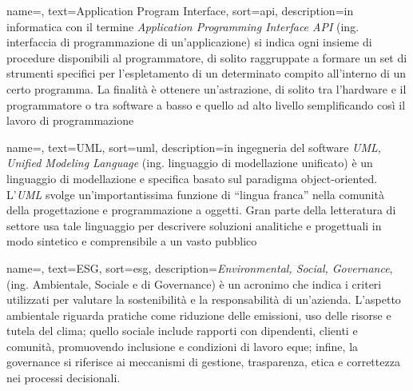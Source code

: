 




 {
    name=,
    text=Application Program Interface,
    sort=api,
    description={in informatica con il termine \emph{Application Programming Interface API} (ing. interfaccia di programmazione di un'applicazione) si indica ogni insieme di procedure disponibili al programmatore, di solito raggruppate a formare un set di strumenti specifici per l'espletamento di un determinato compito all'interno di un certo programma. La finalità è ottenere un'astrazione, di solito tra l'hardware e il programmatore o tra software a basso e quello ad alto livello semplificando così il lavoro di programmazione}
}

 {
    name=,
    text=UML,
    sort=uml,
    description={in ingegneria del software \emph{UML, Unified Modeling Language} (ing. linguaggio di modellazione unificato) è un linguaggio di modellazione e specifica basato sul paradigma object-oriented. L'\emph{UML} svolge un'importantissima funzione di ``lingua franca'' nella comunità della progettazione e programmazione a oggetti. Gran parte della letteratura di settore usa tale linguaggio per descrivere soluzioni analitiche e progettuali in modo sintetico e comprensibile a un vasto pubblico}
}

 {
    name=,
    text=ESG,
    sort=esg,
    description={\emph{Environmental, Social, Governance}, (ing. Ambientale, Sociale e di Governance) è un acronimo che indica i criteri utilizzati per valutare la sostenibilità e la responsabilità di un'azienda. L'aspetto ambientale riguarda pratiche come riduzione delle emissioni, uso delle risorse e tutela del clima; quello sociale include rapporti con dipendenti, clienti e comunità, promuovendo inclusione e condizioni di lavoro eque; infine, la governance si riferisce ai meccanismi di gestione, trasparenza, etica e correttezza nei processi decisionali.}
}